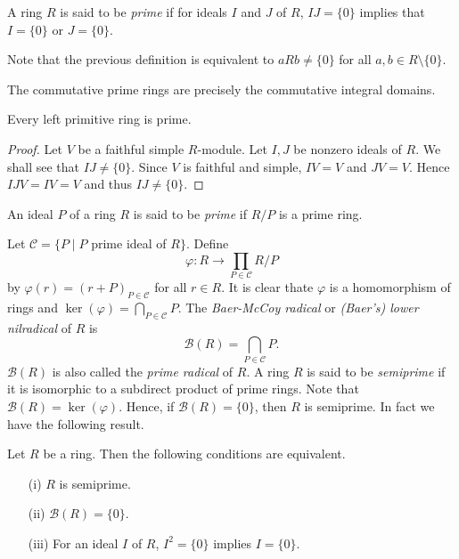 \begin{definition}
A ring $R$ is said to be \emph{prime} if for ideals $I$ and $J$ of $R$, $IJ=\{0\}$ implies that
$I=\{0\}$ or $J=\{0\}$. 
\end{definition}

Note that the previous definition is equivalent to $aRb\neq\{0\}$ for all $a,b\in R\setminus\{0\}$.

\begin{example}
The commutative prime rings are precisely the commutative integral domains.
\end{example}

\begin{proposition}\label{Prop1.3.5}
Every left primitive ring is prime.
\end{proposition}

\begin{proof}
Let $V$ be a faithful simple $R$-module. Let $I,J$ be nonzero ideals of
$R$. We shall see that $IJ\neq \{0\}$. Since $V$ is faithful and simple,
$IV=V$ and $JV=V$. Hence $IJV=IV=V$ and thus $IJ\neq \{0\}$. 
\end{proof}

\begin{definition}
An ideal $P$ of a ring $R$ is said to be \emph{prime} if $R/P$ is a prime ring.
\end{definition}

Let $\mathcal{C}=\{ P\mid P$ prime ideal of $R\}$. Define
\[
\varphi\colon R\rightarrow \prod_{P\in\mathcal{C}}R/P
\]
by $\varphi (r)=(r+P)_{P\in\mathcal{C}}$ for all $r\in R$. It is clear thate $\varphi$ 
is a homomorphism of rings and $\ker(\varphi
)=\bigcap_{P\in \mathcal{C}}P$. The \emph{Baer-McCoy radical} or \emph{(Baer's) lower nilradical} of $R$ is
$$\mathcal{B}(R)=\bigcap_{P\in\mathcal{C}}P.$$
$\mathcal{B}(R)$ is also called the \emph{prime radical} of $R$.
A ring $R$ is said to be \emph{semiprime} if it is isomorphic to a subdirect product of prime rings.
Note that $\mathcal{B}(R)=\ker(\varphi)$. Hence, if $\mathcal{B}(R)=\{0\}$, then $R$ is semiprime. 
In fact we have the following result.

\begin{theorem}\label{Teorema 1.3.6}
Let $R$ be a ring. Then the following conditions are equivalent.
\begin{itemize}\item[(i)] $R$ is semiprime.
\item[(ii)] $\mathcal{B}(R)=\{0\}$.
\item[(iii)] For an ideal $I$ of $R$, $I^2=\{0\}$ implies $I=\{0\}$.
\end{itemize}
\end{theorem}

